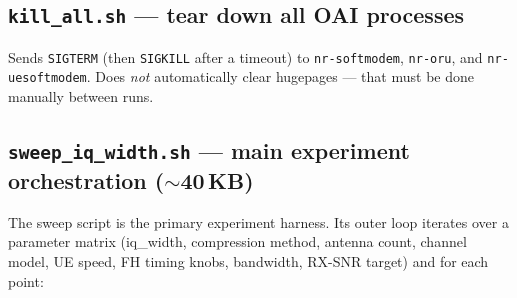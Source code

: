 \documentclass[11pt,a4paper]{article}
\begin{document}
\subsection{\texttt{kill\_all.sh} --- tear down all OAI processes}

Sends \texttt{SIGTERM} (then \texttt{SIGKILL} after a timeout) to
\texttt{nr-softmodem}, \texttt{nr-oru}, and \texttt{nr-uesoftmodem}. Does \emph{not}
automatically clear hugepages --- that must be done manually between runs.

\subsection{\texttt{sweep\_iq\_width.sh} --- main experiment orchestration ($\sim$40\,KB)}

The sweep script is the primary experiment harness. Its outer loop iterates over a parameter
matrix (iq\_width, compression method, antenna count, channel model, UE speed, FH timing
knobs, bandwidth, RX-SNR target) and for each point:
\end{document}
